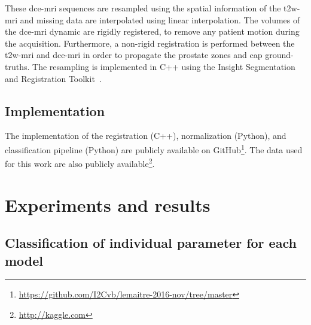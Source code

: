 These \ac{dce}-\ac{mri} sequences are resampled using the spatial information of the \ac{t2w}-\ac{mri} and missing data are interpolated using linear interpolation.
The volumes of the \ac{dce}-\ac{mri} dynamic are rigidly registered, to remove any patient motion during the acquisition.
Furthermore, a non-rigid registration is performed between the \ac{t2w}-\ac{mri} and \ac{dce}-\ac{mri} in order to propagate the prostate zones and \ac{cap} ground-truths.
The resampling is implemented in C++ using the Insight Segmentation and Registration Toolkit~\citep{ibanez2005itk}.

\subsection{Implementation}

The implementation of the registration (C++), normalization (Python), and classification pipeline (Python) are publicly available on GitHub\footnote{\url{https://github.com/I2Cvb/lemaitre-2016-nov/tree/master}}.
The data used for this work are also publicly available\footnote{\url{http://kaggle.com}}.

\section{Experiments and results}\label{sec:experiments}

\subsection{Classification of individual parameter for each model}

